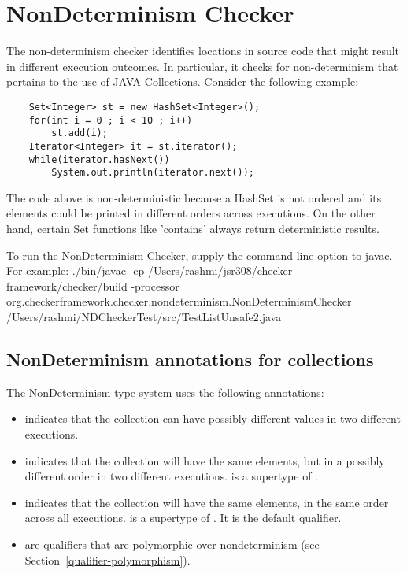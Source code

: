 \htmlhr
\chapter{NonDeterminism Checker\label{nondeterminism-checker}}
The non-determinism checker identifies locations in source code that might result in different execution outcomes. 
In particular, it checks for non-determinism that pertains to the use of JAVA Collections.
Consider the following example:
\begin{Verbatim}
	Set<Integer> st = new HashSet<Integer>(); 
	for(int i = 0 ; i < 10 ; i++)
		st.add(i);
	Iterator<Integer> it = st.iterator();
	while(iterator.hasNext())
		System.out.println(iterator.next());

\end{Verbatim}

The code above is non-deterministic because a HashSet is not ordered and its elements could be printed in different orders across executions.
On the other hand, certain Set functions like 'contains' always return deterministic results.

To run the NonDeterminism Checker, supply the
command-line option to javac.
For example: ./bin/javac -cp /Users/rashmi/jsr308/checker-framework/checker/build -processor org.checkerframework.checker.nondeterminism.NonDeterminismChecker /Users/rashmi/NDCheckerTest/src/TestListUnsafe2.java

\section{NonDeterminism annotations for collections\label{nondeterminism-annotations-collections}}

The NonDeterminism type system uses the following annotations:
\begin{itemize}
\item
   indicates
  that the collection can have possibly different values in two different executions.
\item
   indicates that
  the collection will have the same elements, but in a possibly different order in two different executions.
   is a supertype of .
 \item
   indicates that
  the collection will have the same elements, in the same order across all executions.
   is a supertype of .
   It is the default qualifier.
\item
   are qualifiers that are
  polymorphic over nondeterminism (see Section~\ref{qualifier-polymorphism}).
\end{itemize}

